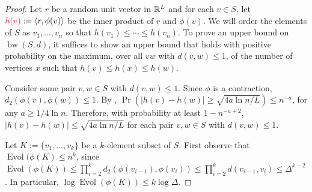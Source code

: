 \documentclass{patmorin}
\makeatletter
\renewcommand{\ge}{\geqslant}
\renewcommand{\le}{\leqslant}
\def\mathcolor#1#{\@mathcolor{#1}}
\def\@mathcolor#1#2#3{%
  \protect\leavevmode
  \begingroup
    \color#1{#2}#3%
  \endgroup
}
\newcommand{\mathdefin}[1]{\mathcolor{brightmaroon}{#1}}
\DeclareMathOperator{\bw}{bw}
\DeclareMathOperator{\evol}{Evol}
\makeatother
\begin{document}
\begin{proof}
  Let $r$ be a random unit vector in $\mathbb{R}^L$ and for each $v\in S$, let $\mathdefin{h(v)}:=\langle r,\phi(v)\rangle$ be the inner product of $r$ and $\phi(v)$.  We will order the elements of $S$ as $v_1,\ldots,v_n$ so that $h(v_1)\le \cdots \le h(v_n)$.  To prove an upper bound on $\bw(S,d)$, it suffices to show an upper bound that holds with positive probability on the maximum, over all $vw$ with $d(v,w)\le 1$, of the number of vertices $x$ such that $h(v)\le h(x)\le h(w)$.

  Consider some pair $v,w\in S$ with $d(v,w)\le 1$. Since $\phi$ is a contraction, $d_2(\phi(v),\phi(w))\le 1$.  By \cite[Proposition~7]{feige:approximating}, $\Pr(|h(v)-h(w)|\ge \sqrt{4a\ln n/L}) \le n^{-a}$, for any $a\ge 1/4\ln n$. Therefore, with probability at least $1-n^{-a+2}$, $|h(v)-h(w)|\le \sqrt{4a\ln n/L}$ for each pair $v,w\in S$ with $d(v,w)\le 1$.

  Let  $K:=\{v_1,\ldots,v_k\}$ be a $k$-element subset of $S$. First observe that $\evol(\phi(K)\le n^k$, since $\evol(\phi(K))\le\prod_{i=2}^k d_2(\phi(v_{i-1}),\phi(v_i))\le \prod_{i=2}^k d(v_{i-1},v_i)\le \Delta^{k-2}$.  In particular, $\log\evol(\phi(K))\le k\log \Delta$.


\end{proof}
\end{document}
